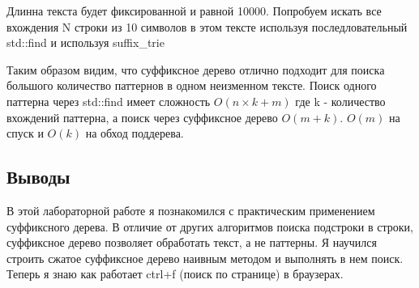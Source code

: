 \documentclass[12pt]{article}
\begin{document}
Длинна текста будет фиксированной и равной 10000. Попробуем искать все вхождения N строки из 10 символов в этом тексте
используя последловательный std::find и используя suffix\_trie



Таким образом видим, что суффиксное дерево отлично подходит для поиска большого количество паттернов в одном неизменном тексте.
Поиск одного паттерна через std::find имеет сложность $O(n \times k + m)$ где k - количество вхождений паттерна,
а поиск через суффиксное дерево $O(m+k)$. $O(m)$ на спуск и $O(k)$ на обход поддерева.

\subsection*{Выводы}

В этой лабораторной работе я познакомился с практическим применением суффиксного
дерева. В отличие от других алгоритмов поиска подстроки в строки, суффиксное дерево
позволяет обработать текст, а не паттерны. Я научился строить сжатое суффиксное дерево
наивным методом и выполнять в нем поиск. Теперь я знаю как работает ctrl+f (поиск по странице) в браузерах.
\end{document}
